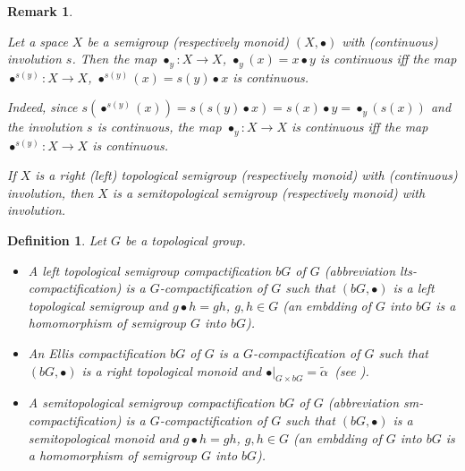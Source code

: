 \documentclass{amsart}
\newtheorem{df}[thm]{Definition}
\newtheorem{rem}[thm]{Remark}
\begin{document}
\begin{rem}\label{seminvtop}
{\rm Let a space $X$ be a semigroup {\rm(}respectively monoid{\rm)} $(X, \bullet)$ with {\rm(}continuous{\rm)} involution $s$. Then the map  $\bullet_y: X\to X$, $\bullet_y(x)=x\bullet y$ is continuous iff the map $\bullet^{s(y)}: X\to X$, $\bullet^{s(y)}(x)=s(y)\bullet x$  is continuous.

Indeed, since $s(\bullet^{s(y)}(x))=s(s(y)\bullet x)=s(x)\bullet y=\bullet_y(s(x))$ and the involution $s$ is continuous, the map $\bullet_y: X\to X$ is continuous iff the map $\bullet^{s(y)}: X\to X$ is continuous. 

\medskip

If $X$ is a right {\rm(}left{\rm)} topological semigroup {\rm(}respectively monoid{\rm)} with {\rm(}continuous{\rm)} involution, then $X$ is a semitopological semigroup {\rm(}respectively monoid{\rm)}  with involution.}
\end{rem}

\begin{df}
Let $G$ be a topological group. 
\begin{itemize}
\item A left topological semigroup compactification $b G$ of $G$ {\rm(}abbreviation lts-compactification{\rm)} is 
a $G$-compactification of $G$ such that $(bG, \bullet)$ is a left topological semigroup and  $g\bullet h=gh$, $g, h\in G$ {\rm(}an embdding of $G$ into $b G$ is a homomorphism of semigroup $G$ into $b G${\rm)}.    
\item An Ellis compactification $b G$ of $G$ is a $G$-compactification of $G$ such that $(bG, \bullet)$ is a right topological monoid and $\bullet|_{G\times b G}=\tilde\alpha$~{\rm(}see {\rm\cite{KozlovSorin})}. 
\item A semitopological semigroup compactification $b G$ of $G$ {\rm(}abbreviation sm-compactification{\rm)} is a $G$-compactification of $G$ such that $(bG, \bullet)$ is a semitopological monoid and $g\bullet h=gh$, $g, h\in G$ {\rm(}an embdding of $G$ into $b G$ is a homomorphism of semigroup $G$ into $b G${\rm)}.  
\end{itemize}
\end{df}
\end{document}
